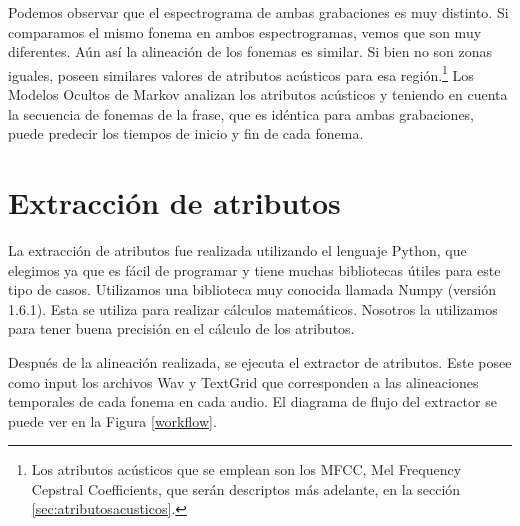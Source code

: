 Podemos observar que el espectrograma de ambas grabaciones es muy distinto. Si comparamos el mismo fonema en ambos espectrogramas, vemos que son muy diferentes. Aún así la alineación de los fonemas es similar. Si bien no son zonas iguales, poseen similares valores de atributos acústicos para esa región.\footnote{Los atributos acústicos que se emplean son los MFCC, Mel Frequency Cepstral Coefficients, que serán descriptos más adelante, en la sección \ref{sec:atributosacusticos}.} Los Modelos Ocultos de Markov analizan los atributos acústicos y teniendo en cuenta la secuencia de fonemas de la frase, que es idéntica para ambas grabaciones, puede predecir los tiempos de inicio y fin de cada fonema.



\section{Extracción de atributos}

La extracción de atributos fue realizada utilizando el lenguaje Python, que elegimos ya que es fácil de programar y tiene muchas bibliotecas útiles para este tipo de casos. Utilizamos una biblioteca muy conocida llamada Numpy (versión 1.6.1). Esta se utiliza para realizar cálculos matemáticos. Nosotros la utilizamos para tener buena precisión en el cálculo de los atributos.

Después de la alineación realizada, se ejecuta el extractor de atributos. Este posee como input los archivos Wav y TextGrid que corresponden a las alineaciones temporales de cada fonema en cada audio. El diagrama de flujo del extractor se puede ver en la Figura \ref{workflow}. 

